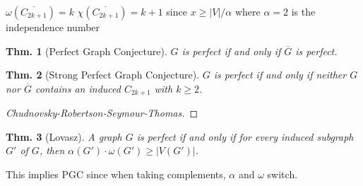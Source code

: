 \documentclass[12pt, a4paper]{book}
\newtheorem{theorem}{Thm.}[section]
\theoremstyle{nonumberplain}
\newtheorem{proof}{Proof}
\begin{document}
$\omega(\overline{C_{2k+1}})=k$
$\chi(\overline{C_{2k+1}})=k+1$ since $x\geq|V|/\alpha$ where $\alpha=2$ is the independence number
\begin{theorem}[Perfect Graph Conjecture]
    $G$ is perfect if and only if $\overline{G}$ is perfect.
\end{theorem}
\begin{theorem}[Strong Perfect Graph Conjecture]
    $G$ is perfect if and only if neither $G$ nor $\overline{G}$ contains an induced $C_{2k+1}$ with $k\geq 2$.
\end{theorem}
\begin{proof}[Chudnovsky-Robertson-Seymour-Thomas]
\end{proof}
\begin{theorem}[Lovasz]
    A graph $G$ is perfect if and only if for every induced subgraph $G'$ of $G$, then $\alpha(G')\cdot\omega(G')\geq|V(G')|$.
\end{theorem}
This implies PGC since when taking complements, $\alpha$ and $\omega$ switch.
\end{document}
